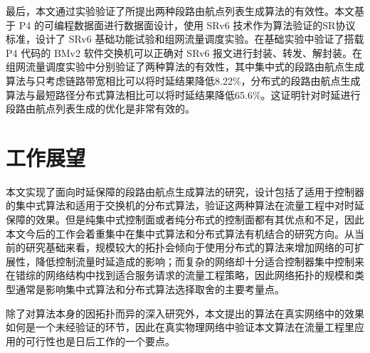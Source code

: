 最后，本文通过实验验证了所提出两种段路由航点列表生成算法的有效性。本文基于 \gls*{P4} \cite{P4LANG} 的可编程数据面进行数据面设计，使用 \gls*{SRv6} \cite{SRARK} 技术作为算法验证的SR协议标准，设计了 \gls*{SRv6} 基础功能试验和组网流量调度实验。在基础实验中验证了搭载 \gls*{P4} 代码的 \gls*{BMv2} 软件交换机可以正确对 \gls*{SRv6} 报文进行封装、转发、解封装。在组网流量调度实验中分别验证了两种算法的有效性，其中集中式的段路由航点生成算法与只考虑链路带宽相比可以将时延结果降低8.22\%，分布式的段路由航点生成算法与最短路径分布式算法相比可以将时延结果降低65.6\%。这证明针对时延进行段路由航点列表生成的优化是非常有效的。

\section{工作展望}

本文实现了面向时延保障的段路由航点生成算法的研究，设计包括了适用于控制器的集中式算法和适用于交换机的分布式算法，验证这两种算法在流量工程中对时延保障的效果。但是纯集中式控制面或者纯分布式的控制面都有其优点和不足，因此本文今后的工作会着重集中在集中式算法和分布式算法有机结合的研究方向。从当前的研究基础来看，规模较大的拓扑会倾向于使用分布式的算法来增加网络的可扩展性，降低控制流量时延造成的影响；而复杂的网络却十分适合控制器集中控制来在错综的网络结构中找到适合服务请求的流量工程策略，因此网络拓扑的规模和类型通常是影响集中式算法和分布式算法选择取舍的主要考量点。

除了对算法本身的因拓扑而异的深入研究外，本文提出的算法在真实网络中的效果如何是一个未经验证的环节，因此在真实物理网络中验证本文算法在流量工程里应用的可行性也是日后工作的一个要点。



\ifx\usechapbib\empty
\nocite{BSTcontrol}
\setcounter{NAT@ctr}{0}


\fi
